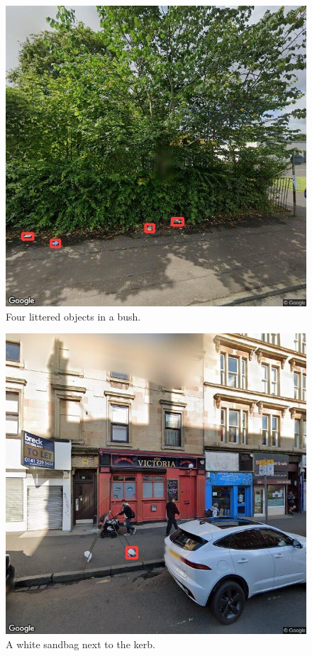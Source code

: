 \documentclass{thesis}
\begin{document}
\begin{figure}[h]
    \centering
    \includegraphics[scale=0.45]{images/good-4-in-bush.jpg}
    \caption{Four littered objects in a bush.}
    \label{fig:4-in-bush}
\end{figure}

\begin{figure}[h]
    \centering
    \includegraphics[scale=0.45]{images/flaw-sandbag.jpg}
    \caption{A white sandbag next to the kerb.}
    \label{fig:sandbag}
\end{figure}
\end{document}
